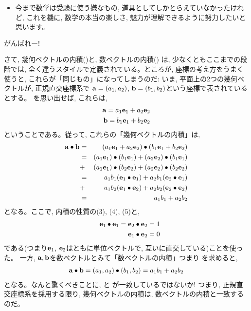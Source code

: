 \begin{itemize}\item 今まで数学は受験に使う嫌なもの, 道具としてしかとらえていなかったけれど, 
これを機に, 数学の本当の楽しさ, 魅力が理解できるように努力したいと思います。\end{itemize}

がんばれー!





さて, 幾何ベクトルの内積()と, 数ベクトルの内積()
は, 少なくともここまでの段階では, 全く違うスタイルで定義されている。ところが, 座標の考え方をうまく使うと, 
これらが「同じもの」になってしまうのだ: いま, 平面上の2つの幾何ベクトルが, 正規直交座標系で
${\bf a}=(a_1, a_2)$, ${\bf b}=(b_1, b_2)$という座標で表されているとする。
を思い出せば, これらは, 
\begin{eqnarray}
{\bf a}=a_1{\bf e}_1+a_2{\bf e}_2\\
{\bf b}=b_1{\bf e}_1+b_2{\bf e}_2
\end{eqnarray}
ということである。従って, これらの「幾何ベクトルの内積」は, 
\begin{eqnarray}
{\bf a}\bullet{\bf b}&=&(a_1{\bf e}_1+a_2{\bf e}_2)\bullet(b_1{\bf e}_1+b_2{\bf e}_2)\nonumber\\
&=&(a_1{\bf e}_1)\bullet(b_1{\bf e}_1)+(a_2{\bf e}_2)\bullet(b_1{\bf e}_1)\nonumber\\
&+&(a_1{\bf e}_1)\bullet(b_2{\bf e}_2)+(a_2{\bf e}_2)\bullet(b_2{\bf e}_2)\nonumber\\
&=&a_1b_1({\bf e}_1\bullet{\bf e}_1)+a_2b_1({\bf e}_2\bullet{\bf e}_1)\nonumber\\
&+&a_1b_2({\bf e}_1\bullet{\bf e}_2)+a_2b_2({\bf e}_2\bullet{\bf e}_2)\nonumber\\
&=&a_1b_1+a_2b_2\label{eq:vect_geom_coord_product}
\end{eqnarray}
となる。ここで, 内積の性質の(3), (4), (5)と, 
\begin{eqnarray}
&&{\bf e}_1\bullet{\bf e}_1={\bf e}_2\bullet{\bf e}_2=1\\
&&{\bf e}_1\bullet{\bf e}_2=0
\end{eqnarray}
である(つまり${\bf e}_1$, ${\bf e}_2$はともに単位ベクトルで, 互いに直交している)ことを使った。
一方, ${\bf a}, {\bf b}$を数ベクトルとみて「数ベクトルの内積」つまり
を求めると, 
\begin{eqnarray}
{\bf a}\bullet{\bf b}=(a_1, a_2)\bullet(b_1, b_2)=a_1b_1 + a_2b_2\label{eq:inprod_coord0}
\end{eqnarray}
となる。なんと驚くべきことに, と
が一致しているではないか! つまり, 正規直交座標系を採用する限り, 幾何ベクトルの内積は, 
数ベクトルの内積と一致するのだ。







